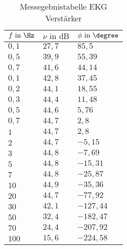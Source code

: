\begin{table}[]
\centering
\caption{Messegebnistabelle EKG Verstärker}
\label{tab:ergTable_ekg}
\begin{tabular}{|l|l|l|}
\hline
\rowcolor[HTML]{C0C0C0} 
$f\text{ in }\Hz     $&$ \nu \text{ in dB}    $&$ \phi \text{ in } \degree    $\\ \hline
$0,1 $&$ 27,7 $&$ 85,5    $\\ \hline
$0,5 $&$ 39,9 $&$ 55,39   $\\ \hline
$0,7 $&$ 41,6 $&$ 44,14   $\\ \hline
$0,1   $&$ 42,8 $&$ 37,45   $\\ \hline
$0,2   $&$ 44,1 $&$ 18,55   $\\ \hline
$0,3   $&$ 44,4 $&$ 11,48   $\\ \hline
$0,5   $&$ 44,6 $&$ 5,76    $\\ \hline
$0,7   $&$ 44,7 $&$ 2,8     $\\ \hline
$1     $&$ 44,7 $&$ 2,8     $\\ \hline
$2     $&$ 44,7 $&$ -5,15   $\\ \hline
$3     $&$ 44,8 $&$ -7,69   $\\ \hline
$5     $&$ 44,8 $&$ -15,31  $\\ \hline
$7     $&$ 44,8 $&$ -25,87  $\\ \hline
$10    $&$ 44,9 $&$ -35,36  $\\ \hline
$20    $&$ 44,7 $&$ -77,92  $\\ \hline
$30    $&$ 42,1 $&$ -127,44 $\\ \hline
$50    $&$ 32,4 $&$ -182,47 $\\ \hline
$70    $&$ 24,4 $&$ -207,92 $\\ \hline
$100   $&$ 15,6 $&$ -224,58 $\\ \hline
\end{tabular}
\end{table}